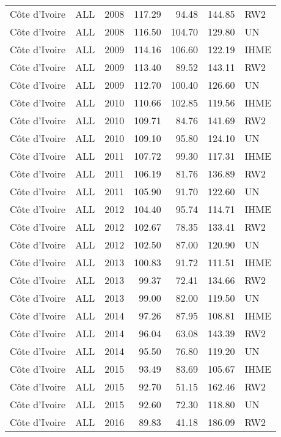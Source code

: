 \begin{longtable}{lllrrrl}
  C\^{o}te d'Ivoire & ALL & 2008 & 117.29 & 94.48 & 144.85 & RW2 \\ 
  C\^{o}te d'Ivoire & ALL & 2008 & 116.50 & 104.70 & 129.80 & UN \\ 
  C\^{o}te d'Ivoire & ALL & 2009 & 114.16 & 106.60 & 122.19 & IHME \\ 
  C\^{o}te d'Ivoire & ALL & 2009 & 113.40 & 89.52 & 143.11 & RW2 \\ 
  C\^{o}te d'Ivoire & ALL & 2009 & 112.70 & 100.40 & 126.60 & UN \\ 
  C\^{o}te d'Ivoire & ALL & 2010 & 110.66 & 102.85 & 119.56 & IHME \\ 
  C\^{o}te d'Ivoire & ALL & 2010 & 109.71 & 84.76 & 141.69 & RW2 \\ 
  C\^{o}te d'Ivoire & ALL & 2010 & 109.10 & 95.80 & 124.10 & UN \\ 
  C\^{o}te d'Ivoire & ALL & 2011 & 107.72 & 99.30 & 117.31 & IHME \\ 
  C\^{o}te d'Ivoire & ALL & 2011 & 106.19 & 81.76 & 136.89 & RW2 \\ 
  C\^{o}te d'Ivoire & ALL & 2011 & 105.90 & 91.70 & 122.60 & UN \\ 
  C\^{o}te d'Ivoire & ALL & 2012 & 104.40 & 95.74 & 114.71 & IHME \\ 
  C\^{o}te d'Ivoire & ALL & 2012 & 102.67 & 78.35 & 133.41 & RW2 \\ 
  C\^{o}te d'Ivoire & ALL & 2012 & 102.50 & 87.00 & 120.90 & UN \\ 
  C\^{o}te d'Ivoire & ALL & 2013 & 100.83 & 91.72 & 111.51 & IHME \\ 
  C\^{o}te d'Ivoire & ALL & 2013 & 99.37 & 72.41 & 134.66 & RW2 \\ 
  C\^{o}te d'Ivoire & ALL & 2013 & 99.00 & 82.00 & 119.50 & UN \\ 
  C\^{o}te d'Ivoire & ALL & 2014 & 97.26 & 87.95 & 108.81 & IHME \\ 
  C\^{o}te d'Ivoire & ALL & 2014 & 96.04 & 63.08 & 143.39 & RW2 \\ 
  C\^{o}te d'Ivoire & ALL & 2014 & 95.50 & 76.80 & 119.20 & UN \\ 
  C\^{o}te d'Ivoire & ALL & 2015 & 93.49 & 83.69 & 105.67 & IHME \\ 
  C\^{o}te d'Ivoire & ALL & 2015 & 92.70 & 51.15 & 162.46 & RW2 \\ 
  C\^{o}te d'Ivoire & ALL & 2015 & 92.60 & 72.30 & 118.80 & UN \\ 
  C\^{o}te d'Ivoire & ALL & 2016 & 89.83 & 41.18 & 186.09 & RW2 \\ 

\end{longtable}
